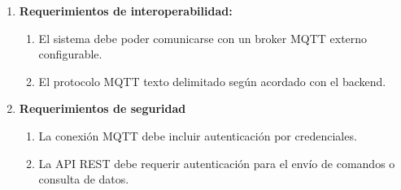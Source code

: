\documentclass[
11pt, %
]{charter}
\begin{document}
\begin{enumerate}
	
	\item \textbf{Requerimientos de interoperabilidad:}
		\begin{enumerate}
			\item  El sistema debe poder comunicarse con un broker MQTT externo configurable.
			\item  El protocolo MQTT texto delimitado según acordado con el backend.
		\end{enumerate}

	\item \textbf{Requerimientos de seguridad}
		\begin{enumerate}
			\item La conexión MQTT debe incluir autenticación por credenciales.
			\item La API REST debe requerir autenticación para el envío de comandos o consulta de datos.
	 	\end{enumerate}
\end{enumerate}
\end{document}
